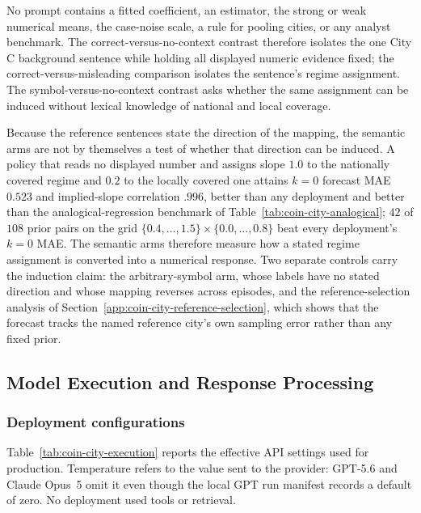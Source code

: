 No prompt contains a fitted coefficient, an estimator, the strong or weak
numerical means, the case-noise scale, a rule for pooling cities, or any analyst
benchmark. The correct-versus-no-context contrast therefore isolates the one City
C background sentence while holding all displayed numeric evidence fixed; the
correct-versus-misleading comparison isolates the sentence's regime assignment.
The symbol-versus-no-context contrast asks whether the same assignment can be
induced without lexical knowledge of national and local coverage.

Because the reference sentences state the direction of the mapping, the semantic
arms are not by themselves a test of whether that direction can be induced. A
policy that reads no displayed number and assigns slope $1.0$ to the
nationally covered regime and $0.2$ to the locally covered one attains $k=0$
forecast MAE $0.523$ and implied-slope correlation $.996$, better than any
deployment and better than the analogical-regression benchmark of
Table~\ref{tab:coin-city-analogical}; $42$ of $108$ prior pairs on the grid
$\{0.4,\dots,1.5\}\times\{0.0,\dots,0.8\}$ beat every deployment's $k=0$ MAE.
The semantic arms therefore measure how a stated regime assignment is converted
into a numerical response. Two separate controls carry the induction claim: the
arbitrary-symbol arm, whose labels have no stated direction and whose mapping
reverses across episodes, and the reference-selection analysis of
Section~\ref{app:coin-city-reference-selection}, which shows that the forecast
tracks the named reference city's own sampling error rather than any fixed prior.

\subsection{Model Execution and Response Processing}
\label{app:coin-city-execution}

\subsubsection{Deployment configurations}
Table~\ref{tab:coin-city-execution} reports the effective API settings used for
production. Temperature refers to the value sent to the provider: GPT-5.6 and
Claude Opus~5 omit it even though the local GPT run manifest records a default of
zero. No deployment used tools or retrieval.

